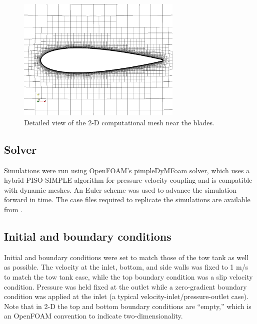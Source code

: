 \documentclass[aip,graphicx]{revtex4-1}
\begin{document}
\begin{figure}
    \centering

    \includegraphics[width=0.7\textwidth]{2D_blade_mesh_closeup}

    \caption{Detailed view of the 2-D computational mesh near the blades.}

    \label{fig:blade-mesh}
\end{figure}


\subsection{Solver}

Simulations were run using OpenFOAM's pimpleDyMFoam solver, which uses a hybrid
PISO-SIMPLE algorithm for pressure-velocity coupling and is compatible with
dynamic meshes. An Euler scheme was used to advance the simulation forward in
time. The case files required to replicate the simulations are available from
\cite{Bachant2016-UNH-RVAT-2D-OpenFOAM-SST, Bachant2016-UNH-RVAT-2D-OpenFOAM-SA,
Bachant2016-UNH-RVAT-3D-OpenFOAM-SST, Bachant2016-UNH-RVAT-3D-OpenFOAM-SA}.


\subsection{Initial and boundary conditions}

Initial and boundary conditions were set to match those of the tow tank as well
as possible. The velocity at the inlet, bottom, and side walls was fixed to 1
m/s to match the tow tank case, while the top boundary condition was a slip
velocity condition. Pressure was held fixed at the outlet while a zero-gradient
boundary condition was applied at the inlet (a typical
velocity-inlet/pressure-outlet case). Note that in 2-D the top and bottom
boundary conditions are ``empty,'' which is an OpenFOAM convention to indicate
two-dimensionality.
\end{document}

